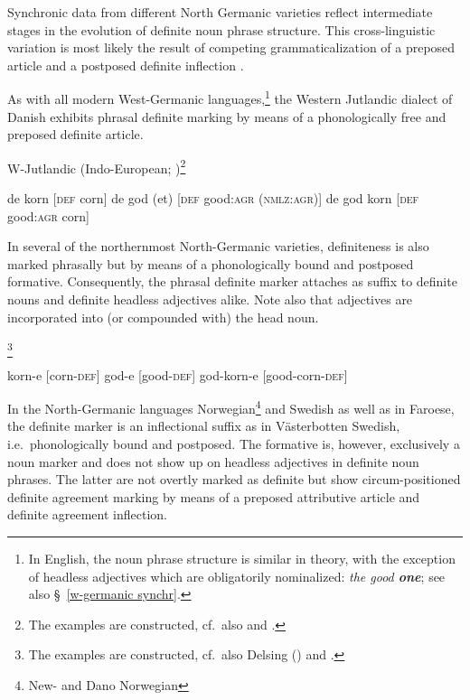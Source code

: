 {Synchronic data from different North Germanic varieties reflect intermediate stages in the evolution of definite noun phrase structure. This cross-linguistic variation is most likely the result of competing grammaticalization of a preposed article and a postposed definite inflection \citep{dahl2003}. 

As with all modern West-Germanic languages,\footnote{In English, the noun phrase structure is similar in theory, with the exception of headless adjectives which are obligatorily nominalized: \textit{the good \textbf{one}}; see also \S~\ref{w-germanic synchr}.} the Western Jutlandic dialect of Danish exhibits phrasal definite marking by means of a phonologically free and preposed definite article.
\begin{exe}
\ex \rm{W-Jutlandic (Indo-European; \citealt{lund1932}})\footnote{The examples are constructed, cf.~also \citet[121–122]{delsing1993} and \citet{dahl2003}.}\\
\begin{xlist}
\ex de korn [\textsc{def} corn]
\ex de god (et) [\textsc{def} good:\textsc{agr} (\textsc{nmlz:agr})]
\ex de god korn [\textsc{def} good:\textsc{agr} corn]
\end{xlist}
\end{exe}
In several of the northernmost North-Germanic varieties, definiteness is also marked phrasally but by means of a phonologically bound and postposed formative. Consequently, the phrasal definite marker attaches as suffix to definite nouns and definite headless adjectives alike. Note also that adjectives are incorporated into (or compounded with) the head noun. 
\begin{exe}
\ex {}\footnote{The examples are constructed, cf.~also Delsing (\citeyear[122–123]{delsing1993}) and \cite{dahl2003}.}\\
\begin{xlist}
\ex korn-e [corn-\textsc{def}]
\ex god-e [good-\textsc{def}]
\ex god-korn-e [good-corn-\textsc{def}]
\end{xlist}
\end{exe}
In the North-Germanic languages Norwegian\footnote{New- and Dano Norwegian} and Swedish as well as in Faroese, the definite marker is an inflectional suffix as in Västerbotten Swedish, i.e.~phonologically bound and postposed. The formative is, however, exclusively a noun marker and does not show up on headless adjectives in definite noun phrases. The latter are not overtly marked as definite but show circum-positioned definite agreement marking by means of a preposed attributive article and definite agreement inflection.
}
